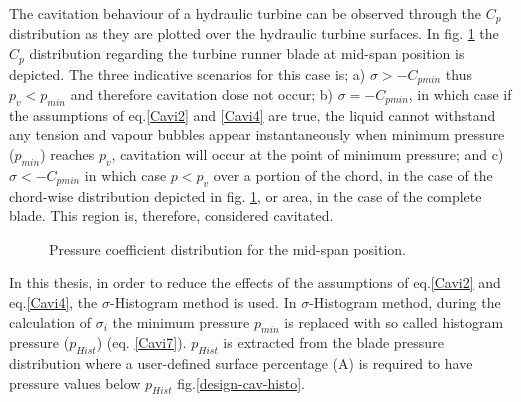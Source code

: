 The cavitation behaviour of a hydraulic turbine can be observed through the $C_p$ distribution as they are plotted over the hydraulic turbine surfaces.  In fig. \ref{design-cav-cp} the $C_p$ distribution regarding the turbine runner blade at mid-span position is depicted. The three indicative scenarios for this case is; a) $\sigma>-C_{pmin}$ thus $p_v<p_{min}$ and therefore cavitation dose not occur; b)  $\sigma=-C_{pmin}$, in which case if the assumptions of eq.\ref{Cavi2} and \ref{Cavi4} are true, the liquid cannot withstand any tension and vapour bubbles appear instantaneously when minimum pressure ($p_{min}$) reaches $p_{v}$, cavitation will occur at the point of minimum pressure; and c) $\sigma<-C_{pmin}$ in which case $p<p_v$ over a portion of the chord, in the case of the chord-wise distribution depicted in fig. \ref{design-cav-cp}, or area, in the case of the complete blade. This region is, therefore, considered cavitated.     

\begin{figure}[h!]
\begin{minipage}[b]{1\linewidth}
 \centering
\end{minipage}
\caption{Pressure coefficient distribution for the mid-span position.}
\label{design-cav-cp}
\end{figure}

In this thesis, in order to reduce the effects of the assumptions of eq.\ref{Cavi2} and eq.\ref{Cavi4}, the $\sigma$-Histogram method \cite{Schmidl} is used. In $\sigma$-Histogram method, during the calculation of $\sigma_i$ the minimum pressure $p_{min}$ is replaced with so called histogram pressure ($p_{Hist}$) (eq. \ref{Cavi7}). $p_{Hist}$ is extracted from the blade pressure distribution where a user-defined surface percentage (A) is required to have pressure values below $p_{Hist}$ fig.\ref{design-cav-histo}.  

